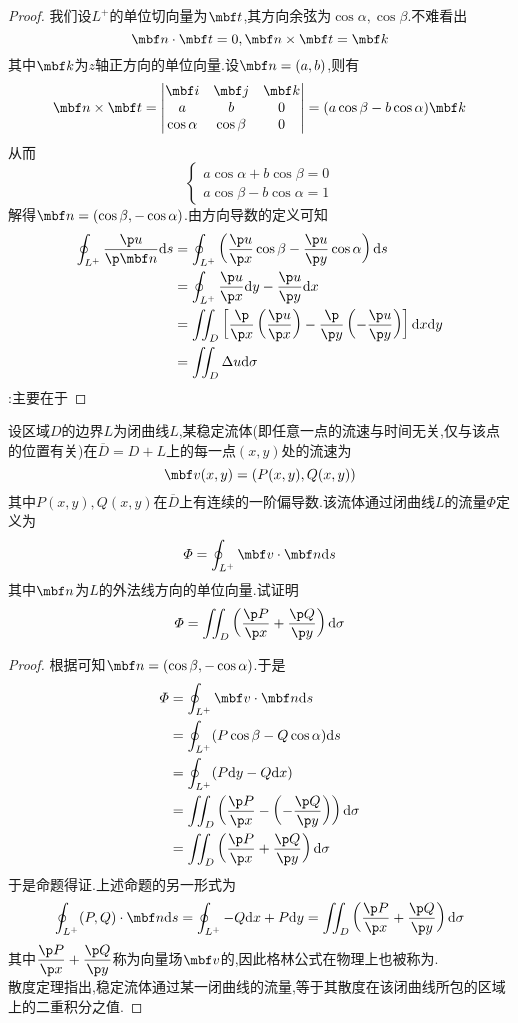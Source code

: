 \documentclass{ctexart}
\begin{document}
\begin{proof}
    我们设$L^+$的单位切向量为$\mbf t$,其方向余弦为$\cos\alpha,\cos\beta$.不难看出
    \[\mbf n\cdot\mbf t=0,\mbf n\times\mbf t=\mbf k\]
    其中$\mbf k$为$z$轴正方向的单位向量.设$\mbf n=(a,b)$,则有
    \[\mbf n\times\mbf t=\begin{vmatrix}
        \mbf i&\mbf j&\mbf k\\a&b&0\\\cos\alpha&\cos\beta&0
    \end{vmatrix}=(a\cos\beta-b\cos\alpha)\mbf k\]
    从而
    \[\left\{\begin{array}{l}
        a\cos\alpha+b\cos\beta=0\\
        a\cos\beta-b\cos\alpha=1
    \end{array}\right.\]
    解得$\mbf n=(\cos\beta,-\cos\alpha)$.由方向导数的定义可知
    \[\begin{aligned}
        \oint_{L^+}\dfrac{\p u}{\p\mbf n}\di s
        &= \oint_{L^+}\left(\dfrac{\p u}{\p x}\cos\beta-\dfrac{\p u}{\p y}\cos\alpha\right)\di s\\
        &= \oint_{L^+}\dfrac{\p u}{\p x}\di y-\dfrac{\p u}{\p y}\di x \\
        &= \iint_{D}\left[\dfrac{\p}{\p x}\left(\dfrac{\p u}{\p x}\right)-\dfrac{\p}{\p y}\left(-\dfrac{\p u}{\p y}\right)\right]\di x\di y \\
        &= \iint_{D}\Delta u\di\sigma
    \end{aligned}\]
    :主要在于
\end{proof}
\begin{problem}[C.2]
    设区域$D$的边界$L$为闭曲线$L$,某稳定流体(即任意一点的流速与时间无关,仅与该点的位置有关)在$\overline{D}=D+L$上的每一点$(x,y)$处的流速为
    \[\mbf v(x,y)=(P(x,y),Q(x,y))\]
    其中$P(x,y),Q(x,y)$在$\overline{D}$上有连续的一阶偏导数.该流体通过闭曲线$L$的流量$\varPhi$定义为
    \[\varPhi=\oint_{L^+}\mbf v\cdot\mbf n\di s\]
    其中$\mbf n$为$L$的外法线方向的单位向量.试证明
    \[\varPhi=\iint_{D}\left(\dfrac{\p P}{\p x}+\dfrac{\p Q}{\p y}\right)\di\sigma\]
\end{problem}
\begin{proof}
    根据可知$\mbf n=(\cos\beta,-\cos\alpha)$.于是
    \[\begin{aligned}
        \varPhi
        &= \oint_{L^+}\mbf v\cdot\mbf n\di s \\
        &= \oint_{L^+}(P\cos\beta-Q\cos\alpha)\di s \\
        &= \oint_{L^+}(P\di y-Q\di x) \\
        &= \iint_{D}\left(\dfrac{\p P}{\p x}-\left(-\dfrac{\p Q}{\p y}\right)\right)\di\sigma \\
        &= \iint_{D}\left(\dfrac{\p P}{\p x}+\dfrac{\p Q}{\p y}\right)\di\sigma
    \end{aligned}\]
    于是命题得证.上述命题的另一形式为
    \[\oint_{L^+}(P,Q)\cdot\mbf n\di s=\oint_{L^+}-Q\di x+P\di y=\iint_{D}\left(\dfrac{\p P}{\p x}+\dfrac{\p Q}{\p y}\right)\di\sigma\]
    其中$\dfrac{\p P}{\p x}+\dfrac{\p Q}{\p y}$称为向量场$\mbf v$的,因此格林公式在物理上也被称为.\\
    散度定理指出,稳定流体通过某一闭曲线的流量,等于其散度在该闭曲线所包的区域上的二重积分之值.
\end{proof}
\end{document}
